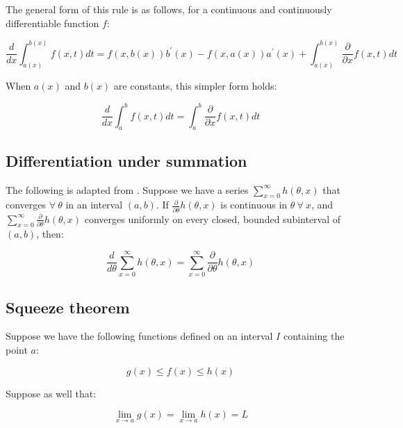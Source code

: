 \documentclass{report}
\begin{document}
The general form of this rule is as follows, for a continuous and continuously differentiable function $f$:

\begin{equation}\label{eq:diff-under-integral-general}
    \frac{d}{dx} \int_{a(x)}^{b(x)} f(x, t) dt = f(x, b(x))b^\prime(x) - f(x, a(x))a^\prime(x) + \int_{a(x)}^{b(x)} \frac{\partial}{\partial x} f(x, t) dt
\end{equation}

When $a(x)$ and $b(x)$ are constants, this simpler form holds:

\begin{equation}\label{eq:diff-under-integral-simple}
    \frac{d}{dx} \int_a^b f(x, t) dt = \int_a^b \frac{\partial}{\partial x} f(x, t) dt
\end{equation}

\subsection{Differentiation under summation}

The following is adapted from \cite[Chapter~2.4]{casella_statistical_2002}. Suppose we have a series $\sum_{x=0}^\infty h(\theta, x)$ that converges $\forall \: \theta$ in an interval $(a, b)$. If $\frac{\partial}{\partial\theta} h(\theta, x)$ is continuous in $\theta \: \forall \: x$, and $\sum_{x=0}^\infty \frac{\partial}{\partial\theta} h(\theta, x)$ converges uniformly on every closed, bounded subinterval of $(a, b)$, then:

\begin{equation}\label{eq:diff-under-summation}
    \frac{d}{d\theta} \sum_{x=0}^\infty h(\theta, x) = \sum_{x=0}^\infty \frac{\partial}{\partial\theta} h(\theta, x)
\end{equation}

\subsection{Squeeze theorem}

Suppose we have the following functions defined on an interval $I$ containing the point $a$:

\begin{equation}\label{eq:squeez-assumption-1}
    g(x) \le f(x) \le h(x)
\end{equation}

Suppose as well that:

\begin{equation}\label{eq:squeeze-assumption-2}
    \lim_{x\to a} g(x) = \lim_{x\to a} h(x) = L
\end{equation}
\end{document}
